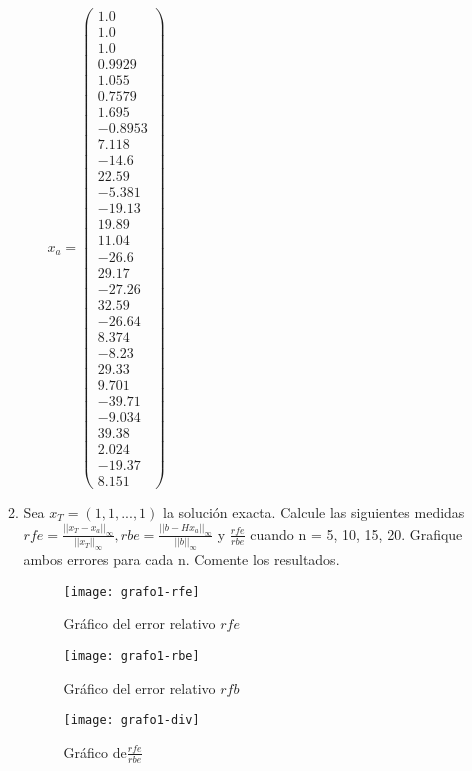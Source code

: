 \documentclass{udpreport}
\begin{document}
\begin{enumerate}
\begin{enumerate}
\begin{itemize}
 				$x_{a} = \left(\begin{array}{c} 1.0\\ 1.0\\ 1.0\\ 0.9929\\ 1.055\\ 0.7579\\ 1.695\\ -0.8953\\ 7.118\\ -14.6\\ 22.59\\ -5.381\\ -19.13\\ 19.89\\ 11.04\\ -26.6\\ 29.17\\ -27.26\\ 32.59\\ -26.64\\ 8.374\\ -8.23\\ 29.33\\ 9.701\\ -39.71\\ -9.034\\ 39.38\\ 2.024\\ -19.37\\ 8.151 \end{array}\right)$
 			\end{itemize}
 			\item Sea $x_{T} = (1, 1, . . . , 1)$ la solución exacta. Calcule las siguientes medidas $rfe = \frac{||x_{T}-x_{a}||_{\infty}}{||x_{T}||_{\infty}} , rbe = \frac{||b-Hx_{a}||_{\infty}}{||b||_{\infty}}$ y $\frac{rfe}{rbe}$ cuando n = 5, 10, 15, 20. Grafique ambos errores para cada n. Comente los
resultados.
 			\begin{figure}[H]
 				\centering
 				\texttt{[image: grafo1-rfe]}
 				\caption{Gráfico del error relativo $rfe$}	
 			\end{figure}
 			
 			\begin{figure}[H]
 				\centering
 				\texttt{[image: grafo1-rbe]}
 				\caption{Gráfico del error relativo $rfb$}		
 			\end{figure}
 			
 			\begin{figure}[H]
 				\centering
 				\texttt{[image: grafo1-div]}
 				\caption{Gráfico de$\frac{rfe}{rbe}$}
	

\end{figure}
\end{enumerate}
\end{enumerate}
\end{document}
